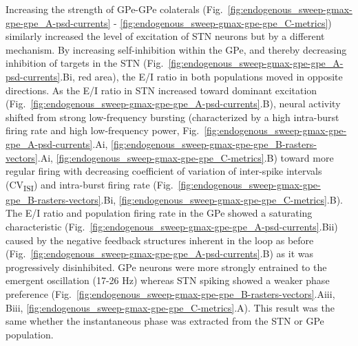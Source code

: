 %
Increasing the strength of GPe-GPe colaterals (Fig.~\ref{fig:endogenous_sweep-gmax-gpe-gpe_A-psd-currents} - \ref{fig:endogenous_sweep-gmax-gpe-gpe_C-metrics}) similarly increased the level of excitation of STN neurons but by a different mechanism. By increasing self-inhibition within the GPe, and thereby decreasing inhibition of targets in the STN (Fig.~\ref{fig:endogenous_sweep-gmax-gpe-gpe_A-psd-currents}.Bi, red area), the E/I ratio in both populations moved in opposite directions. As the E/I ratio in STN increased toward dominant excitation (Fig.~\ref{fig:endogenous_sweep-gmax-gpe-gpe_A-psd-currents}.B), neural activity shifted from strong low-frequency bursting (characterized by a high intra-burst firing rate and high low-frequency power, Fig.~\ref{fig:endogenous_sweep-gmax-gpe-gpe_A-psd-currents}.Ai, \ref{fig:endogenous_sweep-gmax-gpe-gpe_B-rasters-vectors}.Ai, \ref{fig:endogenous_sweep-gmax-gpe-gpe_C-metrics}.B) toward more regular firing with decreasing coefficient of variation of inter-spike intervals (CV\textsubscript{ISI}) and intra-burst firing rate (Fig.~\ref{fig:endogenous_sweep-gmax-gpe-gpe_B-rasters-vectors}.Bi, \ref{fig:endogenous_sweep-gmax-gpe-gpe_C-metrics}.B).
The E/I ratio and population firing rate in the GPe showed a saturating characteristic (Fig.~\ref{fig:endogenous_sweep-gmax-gpe-gpe_A-psd-currents}.Bii) caused by the negative feedback structures inherent in the loop as before (Fig.~\ref{fig:endogenous_sweep-gmax-gpe-gpe_A-psd-currents}.B) as it was progressively disinhibited.
%
GPe neurons were more strongly entrained to the emergent oscillation (17-26 Hz) whereas STN spiking showed a weaker phase preference (Fig.~\ref{fig:endogenous_sweep-gmax-gpe-gpe_B-rasters-vectors}.Aiii, Biii, \ref{fig:endogenous_sweep-gmax-gpe-gpe_C-metrics}.A). This result was the same whether the instantaneous phase was extracted from the STN or GPe population.

